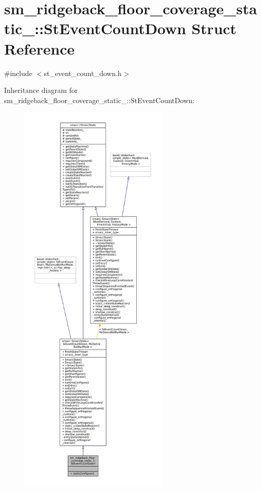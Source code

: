 \hypertarget{structsm__ridgeback__floor__coverage__static__1_1_1StEventCountDown}{}\section{sm\+\_\+ridgeback\+\_\+floor\+\_\+coverage\+\_\+static\+\_\+:\+:St\+Event\+Count\+Down Struct Reference}
\label{structsm__ridgeback__floor__coverage__static__1_1_1StEventCountDown}


{\ttfamily \#include $<$st\+\_\+event\+\_\+count\+\_\+down.\+h$>$}



Inheritance diagram for sm\+\_\+ridgeback\+\_\+floor\+\_\+coverage\+\_\+static\+\_\+:\+:St\+Event\+Count\+Down\+:
\nopagebreak
\begin{figure}[H]
\begin{center}
\leavevmode
\includegraphics[height=550pt]{structsm__ridgeback__floor__coverage__static__1_1_1StEventCountDown__inherit__graph}
\end{center}
\end{figure}



